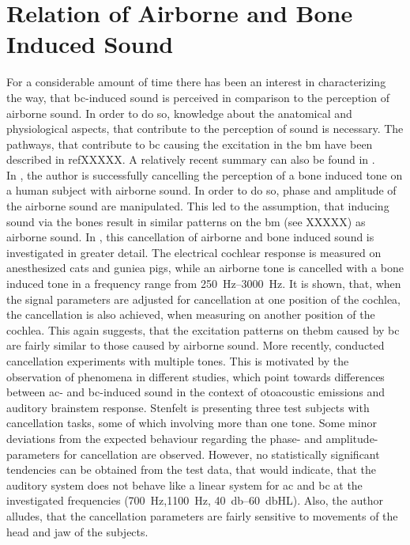 \section{Relation of Airborne and Bone Induced Sound}
For a considerable amount of time there has been an interest in characterizing the way, that \gls{bc}-induced sound is perceived in comparison to the perception of  airborne sound. In order to do so, knowledge about the anatomical and physiological aspects, that contribute to the perception of sound is necessary.
The pathways, that contribute to \gls{bc} causing the excitation in the \gls{bm} have been described in refXXXXX. A relatively recent summary can also be found in \citep{dauman_2013}.\\
In \citep{bekesy_1932}, the author is successfully cancelling the perception of a bone induced tone on a human subject with airborne sound. In order to do so, phase and amplitude of the airborne sound are manipulated. This led to the assumption, that inducing sound via the bones result in similar patterns on the \gls{bm} (see XXXXX) as airborne sound.
In \citep{lowy_1942}, this cancellation of airborne and bone induced sound is investigated in greater detail. The electrical cochlear response is measured on anesthesized cats and guniea pigs, while an airborne tone is cancelled with a bone induced tone in a frequency range from \SIrange{250}{3000}{\hertz}. It is shown, that, when the signal parameters are adjusted for cancellation at one position of the cochlea, the cancellation is also achieved, when measuring on another position of the cochlea. This again suggests, that the excitation patterns on the\gls{bm} caused by \gls{bc} are fairly similar to those caused by airborne sound. More recently, \citep{stenfelt_2007} conducted cancellation experiments with multiple tones. This is motivated by the observation of phenomena in different studies, which point towards differences between \gls{ac}- and \gls{bc}-induced sound in the context of otoacoustic emissions and auditory brainstem response. 
Stenfelt is presenting three test subjects with cancellation tasks, some of which involving more than one tone. Some minor deviations from the expected behaviour regarding the phase- and amplitude-parameters for cancellation are observed. However, no statistically significant tendencies can be obtained from the test data, that would indicate, that the auditory system does not behave like a linear system for \gls{ac} and \gls{bc} at the investigated frequencies (\SI{700}{\hertz},\SI{1100}{\hertz}, \SIrange{40}{60}{\decibel}HL).
Also, the author alludes, that the cancellation parameters are fairly sensitive to movements of the head and jaw of the subjects. 